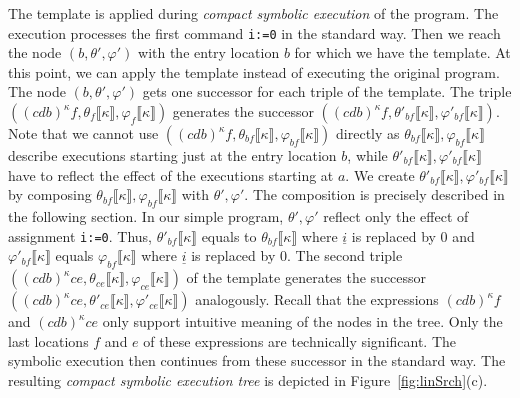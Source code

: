 \documentclass{sig-alternate}%
\newcommand{\var}[1]{{\tt #1}}
\newcommand{\sym}[1]{\ensuremath{\underline{#1}}}
\newcommand{\prm}[1]{\ensuremath{\llbracket #1 \rrbracket}}
\begin{document}
The template is applied during \emph{compact symbolic execution} of the
program. The execution processes the first command \texttt{i:=0} in the
standard way. Then we reach the node $(b,\theta',\varphi')$ with the entry
location $b$ for which we have the template.
At this point, we can apply the template instead of executing the original
program. The node $(b,\theta',\varphi')$ gets one successor for each triple
of the template. The triple $((cdb)^\kappa
f,\theta_f\prm{\kappa},\varphi_f\prm{\kappa})$ generates the successor
$((cdb)^\kappa
f,\theta'_{b\!f}\prm{\kappa},\varphi'_{b\!f}\prm{\kappa})$. Note that we
cannot use $((cdb)^\kappa
f,\theta_{b\!f}\prm{\kappa},\varphi_{b\!f}\prm{\kappa})$ directly as
$\theta_{b\!f}\prm{\kappa},\varphi_{b\!f}\prm{\kappa}$ describe executions
starting just at the entry location $b$, while
$\theta'_{b\!f}\prm{\kappa},\varphi'_{b\!f}\prm{\kappa}$ have to reflect the
effect of the executions starting at $a$. We create
$\theta'_{b\!f}\prm{\kappa},\varphi'_{b\!f}\prm{\kappa}$ by composing
$\theta_{b\!f}\prm{\kappa},\varphi_{b\!f}\prm{\kappa}$ with
$\theta',\varphi'$. The composition is precisely described in the following
section. In our simple program, $\theta',\varphi'$ reflect only the effect
of assignment \texttt{i:=0}. Thus, $\theta'_{b\!f}\prm{\kappa}$ equals to
$\theta_{b\!f}\prm{\kappa}$ where $\sym{i}$ is replaced by $0$ and
$\varphi'_{b\!f}\prm{\kappa}$ equals $\varphi_{b\!f}\prm{\kappa}$ where
$\sym{i}$ is replaced by $0$. The second triple $((cdb)^\kappa
ce,\theta_{ce}\prm{\kappa},\varphi_{ce}\prm{\kappa})$ of the template
generates the successor $((cdb)^\kappa
ce,\theta'_{ce}\prm{\kappa},\varphi'_{ce}\prm{\kappa})$ analogously. Recall
that the expressions $(cdb)^\kappa f$ and $(cdb)^\kappa ce$ only support
intuitive meaning of the nodes in the tree. Only the last locations $f$ and
$e$ of these expressions are technically significant. The symbolic execution
then continues from these successor in the standard way. The resulting
\emph{compact symbolic execution tree} is depicted in
Figure~\ref{fig:linSrch}(c).
\end{document}
